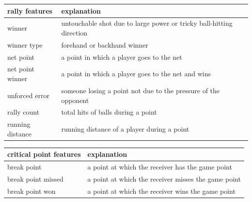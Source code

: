 \documentclass[UTF8]{mcmthesis}
\begin{document}
\begin{itemize}
    \begin{table}[!ht]
    \centering
    \begin{tabular}{|l|l|}
    \hline
        rally features & explanation  \\ \hline
        winner & untouchable shot due to large power or tricky ball-hitting direction  \\ \hline
        winner type & forehand or backhand winner  \\ \hline
        net point & a point in which a player goes to the net  \\ \hline
        net point winner & a point in which a player goes to the net and wins  \\ \hline
        unforced error & someone losing a point not due to the pressure of the opponent  \\ \hline
        rally count & total hits of balls during a point  \\ \hline
        running distance & running distance of a player during a point  \\ \hline
    \end{tabular}
    \label{global features}
\end{table}
        
        \begin{table}[!ht]
    \centering
    \begin{tabular}{|l|l|}
    \hline
        critical point features & explanation  \\ \hline
        break point & a point at which the receiver has the game point  \\ \hline
        break point missed & a point at which the receiver misses the game point  \\ \hline
        break point won & a point at which the receiver wins the game point  \\ \hline
    \end{tabular}
\end{table}%
	\end{itemize}
\end{document}
